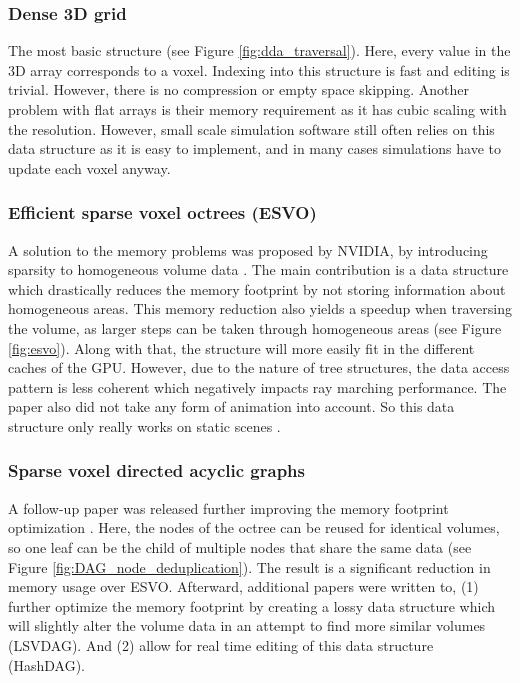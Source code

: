 \subsubsection{Dense 3D grid} \label{introduction:voxel_data_structures:dense_grid}
The most basic structure (see Figure \ref{fig:dda_traversal}). Here, every value in the 3D array corresponds to a voxel. Indexing into this structure is fast and editing is trivial. However, there is no compression or empty space skipping. Another problem with flat arrays is their memory requirement as it has cubic scaling with the resolution. However, small scale simulation software still often relies on this data structure as it is easy to implement, and in many cases simulations have to update each voxel anyway.



\subsubsection{Efficient sparse voxel octrees (ESVO)} \label{introduction:voxel_data_structures:esvo}
A solution to the memory problems was proposed by NVIDIA, by introducing sparsity to homogeneous volume data \cite{laine2010efficient}. The main contribution is a data structure which drastically reduces the memory footprint by not storing information about homogeneous areas. This memory reduction also yields a speedup when traversing the volume, as larger steps can be taken through homogeneous areas (see Figure \ref{fig:esvo}). Along with that, the structure will more easily fit in the different caches of the GPU. However, due to the nature of tree structures, the data access pattern is less coherent which negatively impacts ray marching performance. The paper also did not take any form of animation into account. So this data structure only really works on static scenes \cite{JohnLinPerfectEngine}.


\subsubsection{Sparse voxel directed acyclic graphs} \label{introduction:voxel_data_structures:svdag}
A follow-up paper was released further improving the memory footprint optimization \cite{kampe2013high}. Here, the nodes of the octree can be reused for identical volumes, so one leaf can be the child of multiple nodes that share the same data (see Figure \ref{fig:DAG_node_deduplication}). The result is a significant reduction in memory usage over ESVO. Afterward, additional papers were written to, (1) further optimize the memory footprint by creating a lossy data structure which will slightly alter the volume data in an attempt to find more similar volumes \cite{van2020lossy} (LSVDAG). And (2) allow for real time editing of this data structure \cite{careil2020interactively} (HashDAG).

